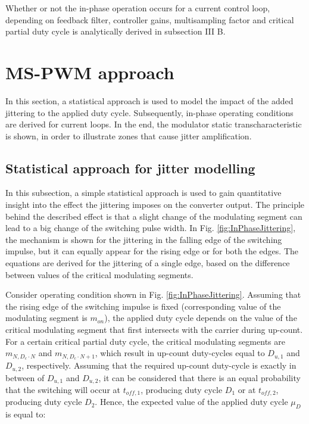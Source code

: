 \documentclass[journal]{IEEEtran}
\begin{document}
Whether or not the in-phase operation occurs for a current control loop, depending on feedback filter, controller gains, multisampling factor and critical partial duty cycle is analytically derived in subsection III B. 

\section{MS-PWM approach}
In this section, a statistical approach is used to model the impact of the added jittering to the applied duty cycle. Subsequently, in-phase operating conditions are derived for current loops. In the end, the modulator static transcharacteristic is shown, in order to illustrate zones that cause jitter amplification.

\subsection{Statistical approach for jitter modelling}
In this subsection, a simple statistical approach is used to gain quantitative insight into the effect the jittering imposes on the converter output.
The principle behind the described effect is that a slight change of the modulating segment can lead to a big change of the switching pulse width.
In Fig. \ref{fig:InPhaseJittering}, the mechanism is shown for the jittering in the falling edge of the switching impulse, but it can equally appear for the rising edge or for both the edges. The equations are derived for the jittering of a single edge, based on the difference between values of the critical modulating segments.

Consider operating condition shown in Fig. \ref{fig:InPhaseJittering}. Assuming that the rising edge of the switching impulse is fixed (corresponding value of the modulating segment is $m_{on}$), the applied duty cycle depends on the value of the critical modulating segment that first intersects with the carrier during up-count. For a certain critical partial duty cycle, the critical modulating segments are $m_{N , D_c \cdot N}$ and $m_{N , D_c \cdot N + 1}$, which result in up-count duty-cycles equal to $D_{u,1}$ and $D_{u,2}$, respectively. Assuming that the required up-count duty-cycle is exactly in between of $D_{u,1}$ and $D_{u,2}$, it can be considered that there is an equal probability that the switching will occur at $t_{off,1}$, producing duty cycle $D_1$ or at $t_{off,2}$, producing duty cycle $D_2$. Hence, the expected value of the applied duty cycle $\mu_D$ is equal to:
\end{document}

